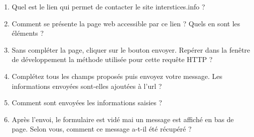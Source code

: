 \documentclass[12pt,a4paper]{article}
\begin{document}
\begin{enumerate}
\item Quel est le lien qui permet de contacter le site \textsf{interstices.info} ?\vspace{1cm}

\item Comment se présente la page web accessible par ce lien ? Quels en sont les éléments ? \vspace{2cm}

\item Sans compléter la page, cliquer sur le bouton \textsf{envoyer}. Repérer dans la fenêtre de développement la méthode utilisée pour cette requête HTTP ? \vspace{1cm}

\item Complétez tous les champs proposés puis envoyez votre message. Les informations envoyées sont-elles ajoutées à l'url ? \vspace{1cm} 

\item Comment sont envoyées les informations saisies ? \vspace{3cm}

\item Après l'envoi, le formulaire est vidé mai un message est affiché en bas de page. Selon vous, comment ce message a-t-il été récupéré ? \vspace{4cm}

\end{enumerate}
\end{document}
